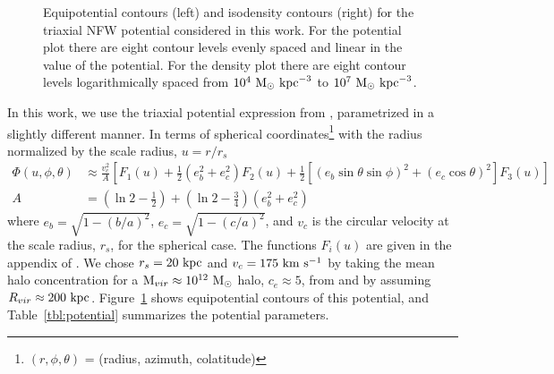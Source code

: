 \documentclass{mn2e}
\newcommand{\msun}{\ensuremath{\mathrm{M}_\odot}}
\begin{document}
\begin{figure}[h]
\centering
\caption{Equipotential contours (left) and isodensity contours (right) for the triaxial NFW potential considered in this work. For the potential plot there are eight contour levels evenly spaced and linear in the value of the potential. For the density plot there are eight contour levels logarithmically spaced from $10^4~\msun~{\rm kpc}^{-3}$ to $10^7~\msun~{\rm kpc}^{-3}$.}
\label{fig:potential}
\end{figure}

In this work, we use the triaxial potential expression from \citet{leesuto03}, parametrized in a slightly different manner. In terms of spherical coordinates\footnote{$(r,\phi,\theta)$ = (radius, azimuth, colatitude)} with the radius normalized by the scale radius, $u = r/r_s$
\begin{align}
	\Phi(u,\phi,\theta) &\approx \frac{v_c^2}{A}\left[F_1(u) + \frac{1}{2}(e_b^2 + e_c^2)F_2(u) + \frac{1}{2} [(e_b\sin\theta \sin\phi)^2 + (e_c\cos\theta)^2] F_3(u) \right]\label{eq:potential}\\
	A &= \left(\ln2 - \frac{1}{2}\right) + \left(\ln2-\frac{3}{4}\right) (e_b^2 + e_c^2)
\end{align}
where $e_b = \sqrt{1 - (b/a)^2}$, $e_c = \sqrt{1 - (c/a)^2}$, and $v_c$ is the circular velocity at the scale radius, $r_s$, for the spherical case. The functions $F_i(u)$ are given in the appendix of \cite{leesuto03}. We chose $r_s=20~{\rm kpc}$ and $v_c = 175~{\rm km}~{\rm s}^{-1}$ by taking the mean halo concentration for a ${\rm M}_{vir} \approx 10^{12}~\msun$ halo, $c_e\approx5$, from \cite{jing02} and by assuming $R_{vir}\approx200~{\rm kpc}$. Figure~\ref{fig:potential} shows equipotential contours of this potential, and Table~\ref{tbl:potential} summarizes the potential parameters.
\end{document}
